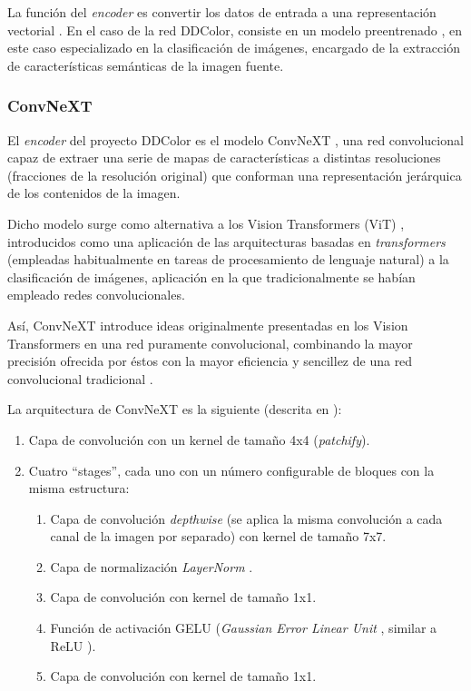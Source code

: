 \documentclass[a4paper]{article}
\begin{document}
La función del \textit{encoder} es convertir los datos de entrada a una representación vectorial \cite{IBMEncoderDecoder}. En el caso de la red DDColor, consiste en un modelo preentrenado \cite{DDColor}, en este caso especializado en la clasificación de imágenes, encargado de la extracción de características semánticas de la imagen fuente.

\subsubsection{ConvNeXT}

El \textit{encoder} del proyecto DDColor es el modelo ConvNeXT \cite{ConvNeXT}, una red convolucional capaz de extraer una serie de mapas de características a distintas resoluciones (fracciones de la resolución original) que conforman una representación jerárquica de los contenidos de la imagen.

Dicho modelo surge como alternativa a los Vision Transformers (ViT) \cite{ConvNeXT, ViT}, introducidos como una aplicación de las arquitecturas basadas en \textit{transformers} \cite{Attention} (empleadas habitualmente en tareas de procesamiento de lenguaje natural) a la clasificación de imágenes, aplicación en la que tradicionalmente se habían empleado redes convolucionales.

Así, ConvNeXT introduce ideas originalmente presentadas en los Vision Transformers en una red puramente convolucional, combinando la mayor precisión ofrecida por éstos con la mayor eficiencia y sencillez de una red convolucional tradicional \cite{ConvNeXT}.

La arquitectura de ConvNeXT es la siguiente (descrita en \cite{ConvNeXT}):

\begin{enumerate}
  \item{Capa de convolución con un kernel de tamaño 4x4 (\textit{patchify}).}
  \item{Cuatro ``stages'', cada uno con un número configurable de bloques con la misma estructura:}
  \begin{enumerate}
    \item{Capa de convolución \textit{depthwise} (se aplica la misma convolución a cada canal de la imagen por separado) con kernel de tamaño 7x7.}
    \item{Capa de normalización \textit{LayerNorm} \cite{LayerNorm}.}
    \item{Capa de convolución con kernel de tamaño 1x1.}
    \item{Función de activación GELU (\textit{Gaussian Error Linear Unit} \cite{GELU}, similar a ReLU \cite{ReLU}).}
    \item{Capa de convolución con kernel de tamaño 1x1.}
  \end{enumerate}
\end{enumerate}
\end{document}
